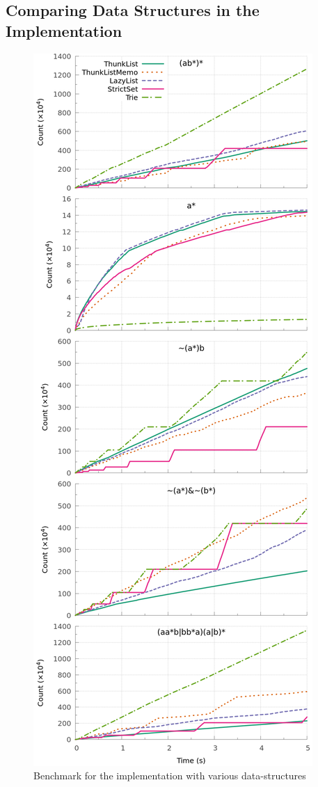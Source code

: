 \subsection{Comparing Data Structures in the \ocaml Implementation}
\label{sec:bench:ocaml}
\begin{figure}[!p]
  \centering
  \includegraphics[width=\linewidth]{measure/ocaml_all.png}
  \caption{Benchmark for the \ocaml implementation with various data-structures}
  \label{bench:ocaml:all}
  \label{bench:ocaml:union}
\end{figure}

